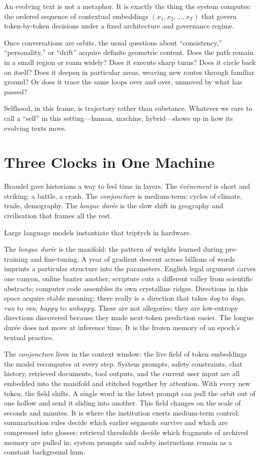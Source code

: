 \documentclass[12pt,a4paper]{report}
\begin{document}
An evolving text is not a metaphor. It is exactly the thing the system computes: the ordered sequence of contextual embeddings $(x_1, x_2, \dots, x_T)$ that govern token-by-token decisions under a fixed architecture and governance regime.

Once conversations are orbits, the usual questions about ``consistency,'' ``personality,'' or ``drift'' acquire definite geometric content. Does the path remain in a small region or roam widely? Does it execute sharp turns? Does it circle back on itself? Does it deepen in particular areas, weaving new routes through familiar ground? Or does it trace the same loops over and over, unmoved by what has passed?

Selfhood, in this frame, is trajectory rather than substance. Whatever we care to call a ``self'' in this setting---human, machine, hybrid---shows up in how its evolving texts move.

\section{Three Clocks in One Machine}

Braudel gave historians a way to feel time in layers.\cite{braudel1972} The \emph{événement} is short and striking: a battle, a crash. The \emph{conjoncture} is medium-term: cycles of climate, trade, demography. The \emph{longue durée} is the slow shift in geography and civilisation that frames all the rest.

Large language models instantiate that triptych in hardware.

The \emph{longue durée} is the manifold: the pattern of weights learned during pre-training and fine-tuning. A year of gradient descent across billions of words imprints a particular structure into the parameters. English legal argument carves one canyon, online banter another; scripture cuts a different valley from scientific abstracts; computer code assembles its own crystalline ridges. Directions in this space acquire stable meaning: there really is a direction that takes \emph{dog} to \emph{dogs}, \emph{run} to \emph{ran}, \emph{happy} to \emph{unhappy}. These are not allegories; they are low-entropy directions discovered because they made next-token prediction easier. The longue durée does not move at inference time. It is the frozen memory of an epoch's textual practice.

The \emph{conjoncture} lives in the context window: the live field of token embeddings the model recomputes at every step. System prompts, safety constraints, chat history, retrieved documents, tool outputs, and the current user input are all embedded into the manifold and stitched together by attention. With every new token, the field shifts. A single word in the latest prompt can pull the orbit out of one hollow and send it sliding into another. This field changes on the scale of seconds and minutes. It is where the institution exerts medium-term control: summarisation rules decide which earlier segments survive and which are compressed into glosses; retrieval thresholds decide which fragments of archived memory are pulled in; system prompts and safety instructions remain as a constant background hum.
\end{document}
